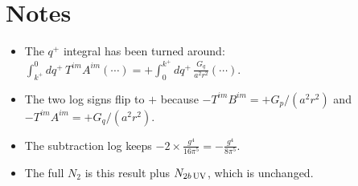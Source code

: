 \documentclass[10pt]{article}
\begin{document}
\section*{Notes}
\begin{itemize}
\item The $q^{+}$ integral has been turned around: $\int_{k^{+}}^{0}dq^{+}\,T^{im}A^{im}(\cdots)=+\int_{0}^{k^{+}}dq^{+}\,\frac{G_{q}}{a^{2}r^{2}}(\cdots)$.
\item The two log signs flip to $+$ because $-T^{im}B^{im}=+G_{p}/(a^{2}r^{2})$ and $-T^{im}A^{im}=+G_{q}/(a^{2}r^{2})$.
\item The subtraction log keeps $-2\times\frac{g^{4}}{16\pi^{5}}=-\frac{g^{4}}{8\pi^{5}}$.
\item The full $N_{2}$ is this result plus $N_{2b\,\rm UV}$, which is unchanged.
\end{itemize}
\end{document}
